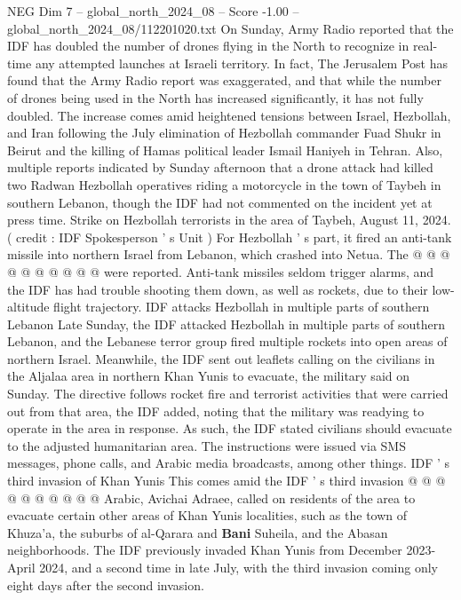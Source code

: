 \begin{textsample}{NEG Dim 7 – global\_north\_2024\_08 – Score -1.00 – global\_north\_2024\_08/112201020.txt}  \label{ex:f7_neg_442}
On Sunday, Army Radio reported that the IDF has doubled the number of drones flying in the North to recognize in real-time any attempted launches at Israeli territory.
In fact, The Jerusalem Post has found that the Army Radio report was exaggerated, and that while the number of drones being used in the North has increased significantly, it has not fully doubled.
The increase comes amid heightened tensions between Israel, Hezbollah, and Iran following the July elimination of Hezbollah commander Fuad Shukr in Beirut and the killing of Hamas political leader Ismail Haniyeh in Tehran.
Also, multiple reports indicated by Sunday afternoon that a drone attack had killed two Radwan Hezbollah operatives riding a motorcycle in the town of Taybeh in southern Lebanon, though the IDF had not commented on the incident yet at press time.
Strike on Hezbollah terrorists in the area of Taybeh, August 11, 2024. ( credit : IDF Spokesperson ' s Unit ) For Hezbollah ' s part, it fired an anti-tank missile into northern Israel from Lebanon, which crashed into Netua.
The @ @ @ @ @ @ @ @ @ @ were reported.
Anti-tank missiles seldom trigger alarms, and the IDF has had trouble shooting them down, as well as rockets, due to their low-altitude flight trajectory.
IDF attacks Hezbollah in multiple parts of southern Lebanon Late Sunday, the IDF attacked Hezbollah in multiple parts of southern Lebanon, and the Lebanese terror group fired multiple rockets into open areas of northern Israel.
Meanwhile, the IDF sent out leaflets calling on the civilians in the Aljalaa area in northern Khan Yunis to evacuate, the military said on Sunday.
The directive follows rocket fire and terrorist activities that were carried out from that area, the IDF added, noting that the military was readying to operate in the area in response.
As such, the IDF stated civilians should evacuate to the adjusted humanitarian area.
The instructions were issued via SMS messages, phone calls, and Arabic media broadcasts, among other things.
IDF ' s third invasion of Khan Yunis This comes amid the IDF ' s third invasion @ @ @ @ @ @ @ @ @ @ Arabic, Avichai Adraee, called on residents of the area to evacuate certain other areas of Khan Yunis localities, such as the town of Khuza'a, the suburbs of al-Qarara and \textbf{Bani} Suheila, and the Abasan neighborhoods.
The IDF previously invaded Khan Yunis from December 2023-April 2024, and a second time in late July, with the third invasion coming only eight days after the second invasion.

\end{textsample}
